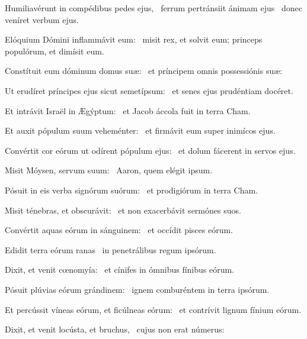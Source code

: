 \item Humiliavérunt in compédibus pedes ejus,~\pscross{} ferrum pertránsiit ánimam ejus~\psstar{} donec veníret verbum ejus.

\item Elóquium Dómini inflammávit eum:~\psstar{} misit rex, et solvit eum; princeps populórum, et dimísit eum.

\item Constítuit eum dóminum domus suæ:~\psstar{} et príncipem omnis possessiónis suæ:

\item Ut erudíret príncipes ejus sicut semetípsum:~\psstar{} et senes ejus prudéntiam docéret.

\item Et intrávit Israël in Ægýptum:~\psstar{} et Jacob áccola fuit in terra Cham.

\item Et auxit pópulum suum veheménter:~\psstar{} et firmávit eum super inimícos ejus.

\item Convértit cor eórum ut odírent pópulum ejus:~\psstar{} et dolum fácerent in servos ejus.

\item Misit Móysen, servum suum:~\psstar{} Aaron, quem elégit ipsum.

\item Pósuit in eis verba signórum suórum:~\psstar{} et prodigiórum in terra Cham.

\item Misit ténebras, et obscurávit:~\psstar{} et non exacerbávit sermónes suos.

\item Convértit aquas eórum in sánguinem:~\psstar{} et occídit pisces eórum.

\item Edidit terra eórum ranas~\psstar{} in penetrálibus regum ipsórum.

\item Dixit, et venit cœnomyía:~\psstar{} et cínifes in ómnibus fínibus eórum.

\item Pósuit plúvias eórum grándinem:~\psstar{} ignem comburéntem in terra ipsórum.

\item Et percússit víneas eórum, et ficúlneas eórum:~\psstar{} et contrívit lignum fínium eórum.

\item Dixit, et venit locústa, et bruchus,~\psstar{} cujus non erat númerus:


